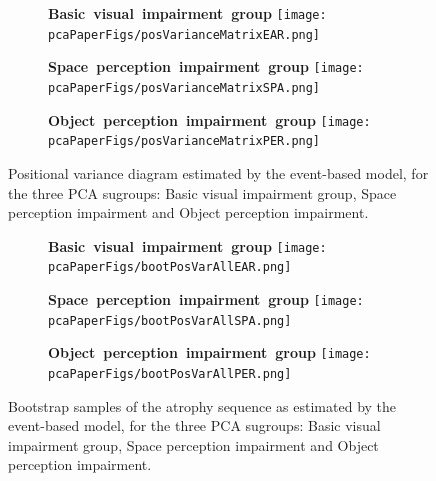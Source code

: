 \begin{figure}
\centering
  \begin{subfigure}[t]{0.48\textwidth}
  \centering
 \textbf{\large{\mbox{Basic visual impairment group}}}
    \texttt{[image: \\pcaPaperFigs/posVarianceMatrixEAR.png]}
 \end{subfigure}
 
  \begin{subfigure}[t]{0.48\textwidth}
  \centering
 \textbf{\large{\mbox{Space perception impairment group}}}
 \texttt{[image: \\pcaPaperFigs/posVarianceMatrixSPA.png]}
 \end{subfigure}

\begin{subfigure}[t]{0.48\textwidth}
\centering
   \textbf{\large{\mbox{Object perception impairment group}}}
 \texttt{[image: \\pcaPaperFigs/posVarianceMatrixPER.png]}
 \end{subfigure}
 \caption[Positional variance diagram estimated by the event-based model, for three PCA sugroups]{Positional variance diagram estimated by the event-based model, for the three PCA sugroups: Basic visual impairment group, Space perception impairment and Object perception impairment.}
   \label{fig:posVarianceMatrixEarSpaPer}
\end{figure}



\begin{figure}
\centering
  \begin{subfigure}[t]{0.48\textwidth}
  \centering
 \textbf{\large{\mbox{Basic visual impairment group}}}
    \texttt{[image: \\pcaPaperFigs/bootPosVarAllEAR.png]}
 \end{subfigure}
 
  \begin{subfigure}[t]{0.48\textwidth}
  \centering
 \textbf{\large{\mbox{Space perception impairment group}}}
 \texttt{[image: \\pcaPaperFigs/bootPosVarAllSPA.png]}
 \end{subfigure}

\begin{subfigure}[t]{0.48\textwidth}
\centering
   \textbf{\large{\mbox{Object perception impairment group}}}
 \texttt{[image: \\pcaPaperFigs/bootPosVarAllPER.png]}
 \end{subfigure}
 \caption[EBM bootstrap samples of the atrophy sequence, for three PCA subgroups]{Bootstrap samples of the atrophy sequence as estimated by the event-based model, for the three PCA sugroups: Basic visual impairment group, Space perception impairment and Object perception impairment.}
 \label{fig:bootPosVarAllEarSpaPer}
\end{figure}


